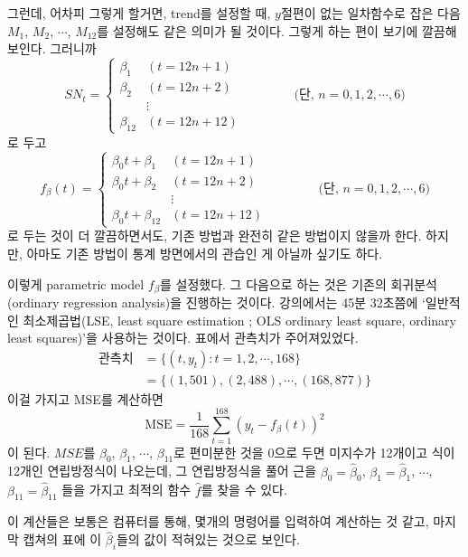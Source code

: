 \documentclass{article}
\begin{document}
그런데, 어차피 그렇게 할거면, trend를 설정할 때, \(y\)절편이 없는 일차함수로 잡은 다음 \(M_1\), \(M_2\), \(\cdots\), \(M_{12}\)를 설정해도 같은 의미가 될 것이다.
그렇게 하는 편이 보기에 깔끔해보인다.
그러니까
\[SN_t = \begin{cases}
\beta_1&(t=12n+1)\\
\beta_2&(t=12n+2)\\
&\vdots\\
\beta_{12}&(t=12n+12)
\end{cases}\qquad\qquad(\text{단, \(n=0,1,2,\cdots,6)\)}\]
로 두고
\[f_\beta(t) = \begin{cases}
\beta_0t+\beta_1&(t=12n+1)\\
\beta_0t+\beta_2&(t=12n+2)\\
&\vdots\\
\beta_0t+\beta_{12}&(t=12n+12)
\end{cases}\qquad\qquad(\text{단, \(n=0,1,2,\cdots,6)\)}\]
로 두는 것이 더 깔끔하면서도, 기존 방법과 완전히 같은 방법이지 않을까 한다.
하지만, 아마도 기존 방법이 통계 방면에서의 관습인 게 아닐까 싶기도 하다.

이렇게 parametric model \(f_\beta\)를 설정했다.
그 다음으로 하는 것은 기존의 회귀분석(ordinary regression analysis)을 진행하는 것이다.
강의에서는 45분 32초쯤에 `일반적인 최소제곱법(LSE, least square estimation ; OLS ordinary least square, ordinary least squares)'을 사용하는 것이다.
표에서 관측치가 주어져있었다.
\begin{equation}\label{observations}
\begin{aligned}
\text{관측치}
&=\{(t,y_t):t=1,2,\cdots,168\}\\
&=\{(1,501), (2,488),\cdots,(168,877)\}
\end{aligned}
\end{equation}
이걸 가지고 MSE를 계산하면
\begin{equation}\label{MSE}
\text{MSE}=\frac1{168}\sum_{t=1}^{168}\left(y_t-f_\beta(t)\right)^2
\end{equation}
이 된다.
\(MSE\)를 \(\beta_0\), \(\beta_1\), \(\cdots\), \(\beta_{11}\)로 편미분한 것을 0으로 두면 미지수가 12개이고 식이 12개인 연립방정식이 나오는데, 그 연립방정식을 풀어 근을 \(\beta_0=\hat\beta_0\), \(\beta_1=\hat\beta_1\), \(\cdots\), \(\beta_{11}=\hat\beta_{11}\) 들을 가지고 최적의 함수 \(\hat f\)를 찾을 수 있다.

이 계산들은 보통은 컴퓨터를 통해, 몇개의 명령어를 입력하여 계산하는 것 같고, 마지막 캡쳐의 표에 이 \(\hat\beta_i\)들의 값이 적혀있는 것으로 보인다.

\end{document}
